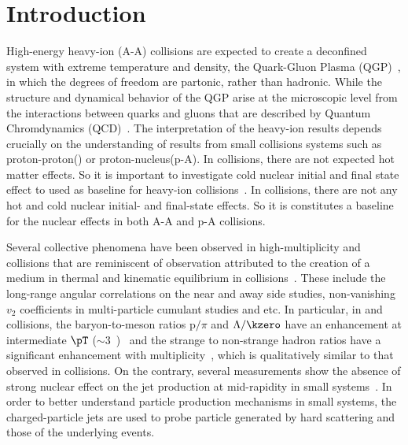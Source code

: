 
\section{Introduction}%
\label{sec:Introduction}

High-energy heavy-ion (A-A) collisions are expected to create a deconfined system with extreme temperature and density, the Quark-Gluon Plasma (QGP)~\cite{Rafelski:126179, Satz:2000bn, Shuryak:1983ni, Jacak:2012dx, Cleymans:1985wb, Bass:1998vz, BraunMunzinger:2007zz}, in which the degrees of freedom are partonic, rather than hadronic.
While the structure and dynamical behavior of the QGP arise at the microscopic level from the interactions between quarks and gluons that are described by Quantum Chromdynamics (QCD)~\cite{Laermann:2003cv, Gupta:2011wh, Bhattacharya:2014ara}.
The interpretation of the heavy-ion results depends crucially on the understanding of results from small collisions systems such as proton-proton(\pp) or proton-nucleus(p-A).
In \pPb collisions, there are not expected hot matter effects.
So it is important to investigate cold nuclear initial and final state effect to used as baseline for heavy-ion collisions~\cite{Salgado:2011wc, Eskola:2016oht}.
In \pp collisions, there are not any hot and cold nuclear initial- and final-state effects.
So it is constitutes a baseline for the nuclear effects in both A-A and p-A collisions.

Several collective phenomena have been observed in high-multiplicity \pp and \pPb collisions that are reminiscent of observation attributed to the creation of a medium in thermal and kinematic equilibrium in \PbPb collisions~\cite{Acharya:2019vdf, Aad:2015gqa, Abelev:2012ola, ABELEV:2013wsa, Khachatryan:2015waa, Abelev:2014uua, Adam:2015vsf}.
These include the long-range angular correlations on the near and away side studies, non-vanishing $v_{2}$ coefficients in multi-particle cumulant studies and etc.
In particular, in \pp and \pPb collisions, the baryon-to-meson ratios p$/\pi$ and $\Lambda/\kzero$ have an enhancement at intermediate $\pT$ ($\sim 3$~\GeVc)~\cite{Acharya:2018orn, Khachatryan:2016yru, Abelev:2013xaa, ALICE:2017jyt} and the strange to non-strange hadron ratios have a significant enhancement with multiplicity~\cite{Abelev:2013haa, ALICE:2017jyt, Khachatryan:2016yru}, which is qualitatively similar to that observed in \PbPb collisions.
On the contrary, several measurements show the absence of strong nuclear effect on the jet production at mid-rapidity in small systems~\cite{Acharya:2019jyg, Acharya:2019tku, ALICE:2014dla, Abelev:2013fn, Acharya:2018eat, Acharya:2017okq, Adam:2015xea, Adam:2016jfp}.
In order to better understand particle production mechanisms in small systems, the charged-particle jets are used to probe particle generated by hard scattering and those of the underlying events. 

